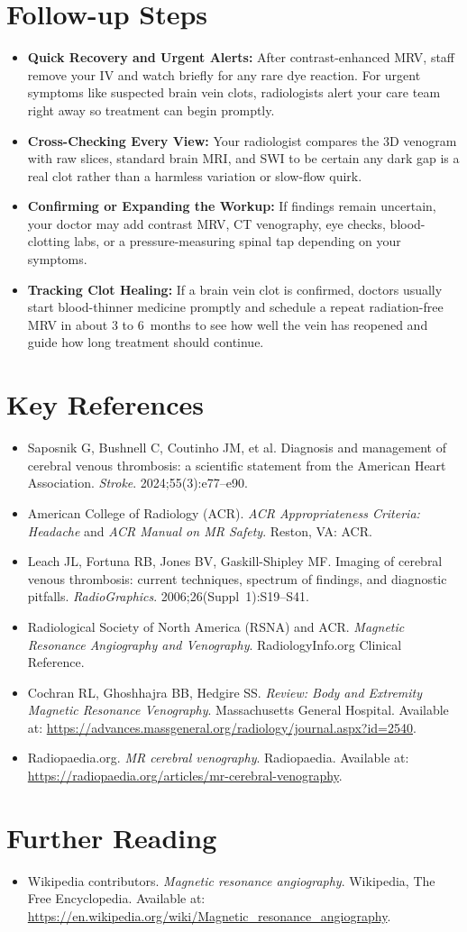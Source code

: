 \section{Follow-up Steps}
\begin{itemize}
\item \textbf{Quick Recovery and Urgent Alerts:} After contrast-enhanced MRV, staff remove your IV and watch briefly for any rare dye reaction. For urgent symptoms like suspected brain vein clots, radiologists alert your care team right away so treatment can begin promptly.
\item \textbf{Cross-Checking Every View:} Your radiologist compares the 3D venogram with raw slices, standard brain MRI, and SWI to be certain any dark gap is a real clot rather than a harmless variation or slow-flow quirk.
\item \textbf{Confirming or Expanding the Workup:} If findings remain uncertain, your doctor may add contrast MRV, CT venography, eye checks, blood-clotting labs, or a pressure-measuring spinal tap depending on your symptoms.
\item \textbf{Tracking Clot Healing:} If a brain vein clot is confirmed, doctors usually start blood-thinner medicine promptly and schedule a repeat radiation-free MRV in about 3 to 6~months to see how well the vein has reopened and guide how long treatment should continue.
\end{itemize}

\section{Key References}
\begin{itemize}
\item Saposnik G, Bushnell C, Coutinho JM, et al. Diagnosis and management of cerebral venous thrombosis: a scientific statement from the American Heart Association. \textit{Stroke}. 2024;55(3):e77--e90.
\item American College of Radiology (ACR). \textit{ACR Appropriateness Criteria: Headache} and \textit{ACR Manual on MR Safety}. Reston, VA: ACR.
\item Leach JL, Fortuna RB, Jones BV, Gaskill-Shipley MF. Imaging of cerebral venous thrombosis: current techniques, spectrum of findings, and diagnostic pitfalls. \textit{RadioGraphics}. 2006;26(Suppl~1):S19--S41.
\item Radiological Society of North America (RSNA) and ACR. \textit{Magnetic Resonance Angiography and Venography}. RadiologyInfo.org Clinical Reference.
\item Cochran RL, Ghoshhajra BB, Hedgire SS. \textit{Review: Body and Extremity Magnetic Resonance Venography}. Massachusetts General Hospital. Available at: \url{https://advances.massgeneral.org/radiology/journal.aspx?id=2540}.
\item Radiopaedia.org. \textit{MR cerebral venography}. Radiopaedia. Available at: \url{https://radiopaedia.org/articles/mr-cerebral-venography}.
\end{itemize}

\section{Further Reading}
\begin{itemize}
  \item Wikipedia contributors. \textit{Magnetic resonance angiography}. Wikipedia, The Free Encyclopedia. Available at: \url{https://en.wikipedia.org/wiki/Magnetic_resonance_angiography}.
\end{itemize}
